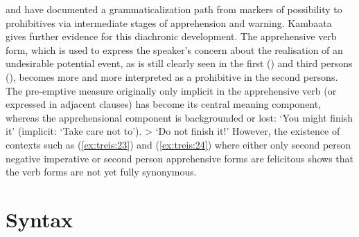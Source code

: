 \documentclass[output=paper,colorlinks,citecolor=brown,
]{langsci/langscibook}
\begin{document}
\citet{Dobrushina2006} and \citet{pakendorfschalley2007} have documented a grammaticalization path from markers of possibility to prohibitives via intermediate stages of apprehension and warning. Kambaata gives further evidence for this diachronic development. The apprehensive verb form, which is used to express the speaker's concern about the realisation of an undesirable potential event, as is still clearly seen in the first () and third persons (), becomes more and more interpreted as a prohibitive in the second persons. The pre-emptive measure originally only implicit in the apprehensive verb (or expressed in adjacent clauses) has become its central meaning component, whereas the apprehensional component is backgrounded or lost: `You might finish it' (implicit: `Take care not to'). > `Do not finish it!' However, the existence of contexts such as (\ref{ex:treis:23}) and (\ref{ex:treis:24}) where either only second person negative imperative or second person apprehensive forms are felicitous shows that the verb forms are not yet fully synonymous.

\section{Syntax}\label{sec:treis:4}
\end{document}
